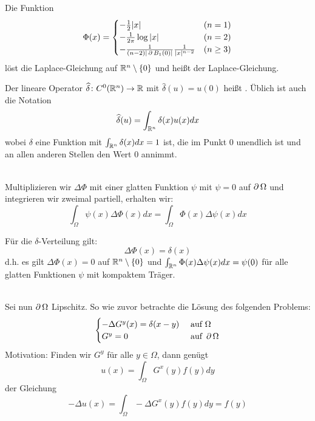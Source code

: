 \begin{defn} \label{def:fundamentallsg_laplace} \label{def_44}
	Die Funktion \marginnote{[44]}
	\[ \Phi(x) = \begin{cases}
		-\frac{1}{2}|x| & (n=1) \\
		-\frac{1}{2\pi} \log |x| & (n=2) \\
		-\frac{1}{(n-2)|\operatorname{\partial} B_1(0)|}\frac{1}{|x|^{n-2}} & (n \geq 3) \end{cases} \]
	löst die Laplace-Gleichung auf $\mathbb{R}^n \setminus \{0\}$ und heißt  der Laplace-Gleichung.
\end{defn}
	
\begin{defn} \label{def:delta_vert} \label{def_45}
	Der lineare Operator $\widehat{\delta}\colon C^0(\mathbb{R}^n) \rightarrow \mathbb{R}$ mit $\widehat{\delta}(u) = u(0)$ heißt . Üblich ist auch die Notation \marginnote{[45]}
	\[ \widehat{\delta}(u) = \int_{\mathbb{R}^n} \delta(x) u(x) dx \]
	wobei $\delta$ eine Funktion mit $\int_{\mathbb{R}^n} \delta(x) dx = 1$ ist, die im Punkt 0 unendlich ist und an allen anderen Stellen den Wert 0 annimmt.
\end{defn}
	
\mbox{} \\
Multiplizieren wir $\Delta \Phi$ mit einer glatten Funktion $\psi$ mit $\psi = 0$ auf $\operatorname{\partial} \Omega$ und integrieren wir zweimal partiell, erhalten wir:
\[ \int_{\Omega} \psi(x) \Delta \Phi(x) dx = \int_{\Omega} \Phi(x) \Delta \psi(x) dx \]

\begin{thm}[Fundamentallösung] \label{thm_46} \label{fundamentallsg}
	Für die $\delta$-Verteilung gilt: \marginnote{[46]}
	\[ \Delta \Phi(x) = \delta(x) \]
	d.h. es gilt $\Delta \Phi(x) = 0$ auf $\mathbb{R}^n \setminus \{0\}$ und $\int_{\mathbb{R}^n} \Phi(x) \Delta \psi(x) dx = \psi(0)$ für alle glatten Funktionen $\psi$ mit kompaktem Träger.
\end{thm}
	
	
\mbox{} \\	
Sei nun $\operatorname{\partial} \Omega$ Lipschitz. So wie zuvor betrachte die Lösung des folgenden Problems:
\begin{equation}
	\begin{cases}
		- \Delta G^y(x) = \delta(x-y) & \text{ auf } \Omega \\
		G^y = 0 & \text{ auf } \operatorname{\partial} \Omega \label{eq_25}
	\end{cases}
\end{equation}
Motivation: Finden wir $G^y$ für alle $y \in \Omega$, dann genügt
\begin{equation}
	u(x) = \int_{\Omega} G^x(y) f(y) dy \label{eq_26}
\end{equation}
der Gleichung
\begin{equation}
	-\Delta u(x) = \int_{\Omega} -\Delta G^x(y) f(y) dy = f(y)
\end{equation}

